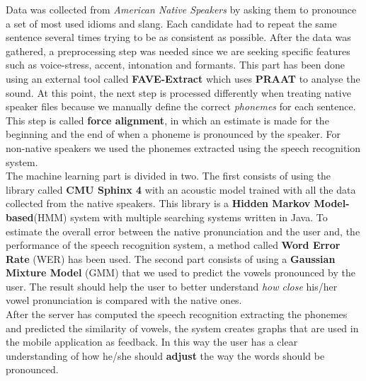 \noindent Data was collected from \textit{American Native Speakers} by asking them to pronounce a set of most used idioms and slang. Each candidate had to repeat the same sentence several times trying to be as consistent as possible. After the data was gathered, a preprocessing step was needed since we are seeking specific features such as voice-stress, accent, intonation and formants.
This part has been done using an external tool called \textbf{FAVE-Extract}\cite{rosenfelder2011fave} which uses \textbf{PRAAT}\cite{boersma2010p} to analyse the sound. At this point, the next step is processed differently when treating native speaker files because we manually define the correct \textit{phonemes} for each sentence. This step is called \textbf{force alignment}, in which an estimate is made for the beginning and the end of when a phoneme is pronounced by the speaker. For non-native speakers we used the phonemes extracted using the speech recognition system. \\

\noindent The machine learning part is divided in two. The first consists of using the library called \textbf{CMU Sphinx 4}\cite{lamere2003cmu} with an acoustic model trained with all the data collected from the native speakers. This library is a \textbf{Hidden Markov Model-based}\cite{eddy1996hidden}(HMM) system with multiple searching systems written in Java. 
To estimate the overall error between the native pronunciation and the user and, the performance of the speech recognition system, a method called \textbf{Word Error Rate} (WER) has been used.
The second part consists of using a \textbf{Gaussian Mixture Model}\cite{reynolds1992gaussian} (GMM) that we used to predict the vowels pronounced by the user. The result should help the user to better understand \textit{how close} his/her vowel pronunciation is compared with the native ones. \\

\noindent After the server has computed the speech recognition extracting the phonemes and predicted the similarity of vowels, the system creates graphs that are used in the mobile application as feedback. In this way the user has a clear understanding of how he/she should \textbf{adjust} the way the words should be pronounced. \\
